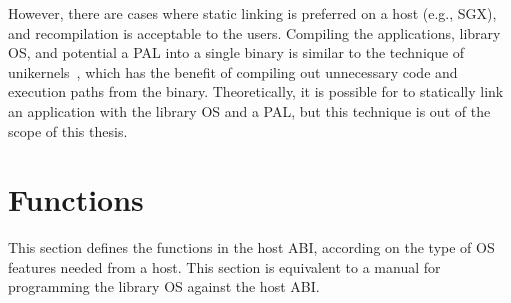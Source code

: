 However, there are cases where static linking is preferred on a host (e.g., SGX), and recompilation is acceptable to the users.
Compiling the applications, library OS, and potential a PAL
into a single binary is similar to the technique of unikernels~\cite{unikernels},
which has the benefit of compiling out unnecessary code and execution paths
from the binary. 
Theoretically, it is possible for \graphene{} to statically link an application with the library OS and a PAL,
but this technique is out of the scope of this thesis.




\section{Functions}


This section defines the functions in the host ABI, according on the type of OS features needed from a host.
This section is equivalent to a manual 
for programming the library OS against the host ABI.

